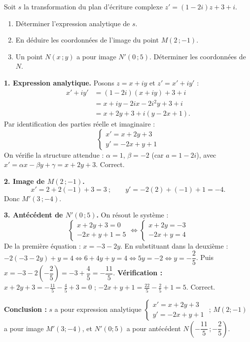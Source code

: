 \documentclass[11pt]{article}
\begin{document}
\begin{exoresolu}
Soit $s$ la transformation du plan d'écriture complexe $z' = (1 - 2i)z + 3 + i$.
\begin{enumerate}
\item Déterminer l'expression analytique de $s$.
\item En déduire les coordonnées de l'image du point $M(2\,;-1)$.
\item Un point $N(x\,;y)$ a pour image $N'(0\,;5)$. Déterminer les coordonnées de $N$.
\end{enumerate}
\tcblower
\textbf{1. Expression analytique.} Posons $z = x + iy$ et $z' = x' + iy'$ :
\begin{align*}
x' + iy' &= (1 - 2i)(x + iy) + 3 + i \\
&= x + iy - 2ix - 2i^2 y + 3 + i \\
&= x + 2y + 3 + i(y - 2x + 1).
\end{align*}
Par identification des parties réelle et imaginaire :
\[ \boxed{\begin{cases} x' = x + 2y + 3 \\ y' = -2x + y + 1 \end{cases}} \]
On vérifie la structure attendue : $\alpha = 1$, $\beta = -2$ (car $a = 1 - 2i$), avec $x' = \alpha x - \beta y + \gamma = x + 2y + 3$. Correct.

\textbf{2. Image de $M(2\,;-1)$.}
\[ x' = 2 + 2(-1) + 3 = 3 \ ; \qquad y' = -2(2) + (-1) + 1 = -4. \]
Donc $M'(3\,;-4)$.

\textbf{3. Antécédent de $N'(0\,;5)$.} On résout le système :
\[ \begin{cases} x + 2y + 3 = 0 \\ -2x + y + 1 = 5 \end{cases} \iff \begin{cases} x + 2y = -3 \\ -2x + y = 4 \end{cases} \]
De la première équation : $x = -3 - 2y$. En substituant dans la deuxième : $-2(-3 - 2y) + y = 4 \iff 6 + 4y + y = 4 \iff 5y = -2 \iff y = -\dfrac{2}{5}$. Puis $x = -3 - 2\left(-\dfrac{2}{5}\right) = -3 + \dfrac{4}{5} = -\dfrac{11}{5}$.
\textbf{Vérification :} $x + 2y + 3 = -\frac{11}{5} - \frac{4}{5} + 3 = 0$ ; $-2x + y + 1 = \frac{22}{5} - \frac{2}{5} + 1 = 5$. Correct.

\textbf{Conclusion :} $s$ a pour expression analytique $\begin{cases} x' = x + 2y + 3 \\ y' = -2x + y + 1 \end{cases}$ ; $M(2;-1)$ a pour image $M'(3;-4)$, et $N'(0;5)$ a pour antécédent $N\left(-\dfrac{11}{5}\,;-\dfrac{2}{5}\right)$.
\end{exoresolu}
\end{document}
